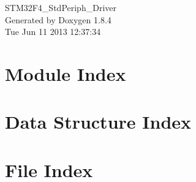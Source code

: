 \documentclass[twoside]{book}
\newcommand{\clearemptydoublepage}{%
  \newpage{\pagestyle{empty}\cleardoublepage}%
}
\begin{document}
\hypersetup{pageanchor=false}
\begin{titlepage}
\vspace*{7cm}
\begin{center}%
{\Large S\-T\-M32\-F4\-\_\-\-Std\-Periph\-\_\-\-Driver }\\
\vspace*{1cm}
{\large Generated by Doxygen 1.8.4}\\
\vspace*{0.5cm}
{\small Tue Jun 11 2013 12:37:34}\\
\end{center}
\end{titlepage}
\clearemptydoublepage
\tableofcontents
\clearemptydoublepage
{}
\hypersetup{pageanchor=true}

\chapter{Module Index}

\chapter{Data Structure Index}

\chapter{File Index}

\end{document}
